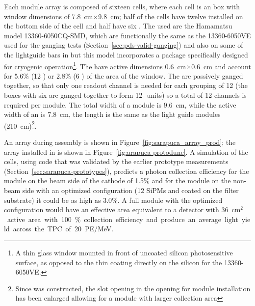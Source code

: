 Each   module array is composed of sixteen cells, where each cell is an  box with window dimensions of \SI{7.8}{cm}$\times$\SI{9.8}{cm}; half of the cells have twelve  installed on the bottom side of the cell and  half have six . 
The  used are the Hamamatsu model 13360-6050CQ-SMD, which are functionally the same as the 13360-6050VE used for the ganging tests (Section~\ref{sec:pds-valid-ganging}) and also on some of the lightguide bars in  but this model incorporates a package specifically designed for cryogenic operation\footnote{A thin glass window mounted in front of uncoated silicon photosensitive surface, as opposed to the thin coating directly on the silicon for the 13360-6050VE.}. 
The  have active dimensions \SI{0.6}{cm}$\times$\SI{0.6}{cm} and account for 5.6\% (\num{12} ) or \num{2.8}\% (\num{6} ) of the area of the window.
The   are passively ganged together, so that only one readout channel is needed for each  grouping of \num{12}  (the boxes with six  are ganged together to form \num{12}- units) so a total of \num{12} channels is required per module. 
The total width of a module is \SI{9.6}{cm}, while the active width of an  is \SI{7.8}{cm}, the length is the same as the light guide modules (\SI{210}{cm})\footnote{Since  was constructed, the slot opening in the  opening for  module installation has been enlarged allowing for a module with larger collection area}.


An  array during assembly is shown in Figure~\ref{fig:sarapuca_array_prod}; the array installed in  is shown in Figure~\ref{fig:arapuca-protodune}. 
A simulation of the  cells, using code that was validated by the earlier prototype measurements (Section~\ref{sec:sarapuca-prototypes}), predicts a photon collection efficiency for the module on the beam side of the cathode of 1.5\% and for the module on the non-beam side with an optimized configuration (\num{12} SiPMs and  coated on the filter substrate) it could be as high as 3.0\%. A full  module with the optimized configuration would have an effective area equivalent to a detector with \SI{36}{cm$^2$} active area with 100\% collection efficiency and produce an average light yield across the TPC of \SI{20}{PE/MeV}.

